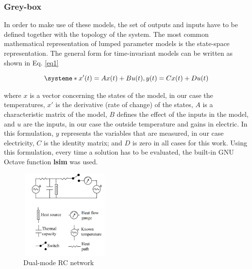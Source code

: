 \documentclass[10pt, conference, compsocconf]{IEEEtran}
\begin{document}


\subsubsection{ Grey-box}


In order to make use of these models, the set of outputs and inputs have to be defined together with the topology of the system. 
The most common mathematical representation of lumped parameter models is the state-space representation. The general form for time-invariant models can be written as shown in Eq. \ref{eq1}

\begin{equation}\label{eq1}
\systeme*{x'(t)=Ax(t) + Bu(t), y(t)= Cx(t) + Du(t)}
\end{equation}

where $x$ is a vector concerning the states of the model, in our case the temperatures, $x'$ is the derivative (rate of change) of the states, $A$ is a characteristic matrix of the model, $B$ defines the effect of the inputs in the model, and $u$ are the inputs, in our case the outside temperature and gains in electric. In this formulation, $y$ represents the variables that are measured, in our case electricity, $C$ is the identity matrix; and $D$ is zero in all cases for this work. Using this formulation, every time a solution has to be evaluated, the built-in GNU Octave function \textbf{lsim} was used.

\begin{figure}[h]%
\centering
\centerline{\includegraphics[width=4.5cm,height=4.5cm,keepaspectratio]{./pics/figAlf.pdf}}
\caption{Dual-mode RC network}\vspace*{-6pt}
  \label{fig:alf}
\end{figure}
\end{document}
